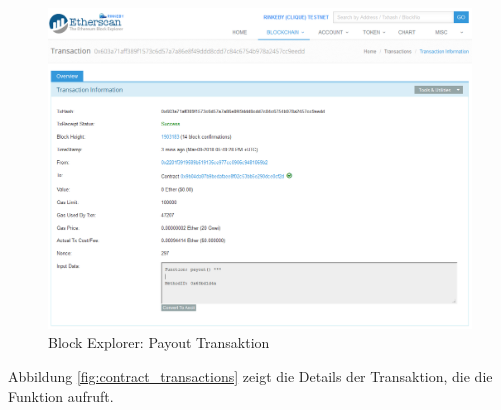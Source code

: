 \begin{figure}[H]
\centering
\includegraphics[width=1\linewidth]{Figures/eth_gui/contract_payout_txn}
\decoRule
\caption{Block Explorer: Payout Transaktion}
\label{fig:contract_payout_txn}
\end{figure}

Abbildung \ref{fig:contract_transactions} zeigt die Details der Transaktion, die die  Funktion aufruft.